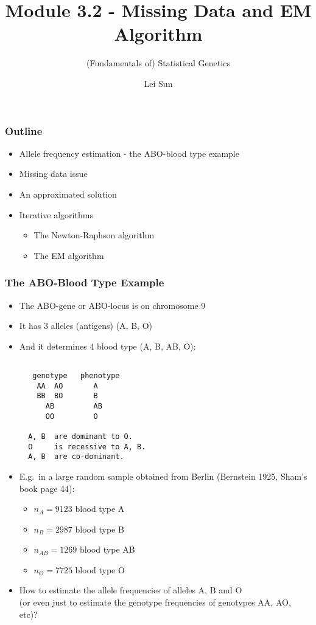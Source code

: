 \documentclass[10pt]{beamer}
\subtitle[Fundamentals of Statistical Genetics] {(Fundamentals of) Statistical Genetics}
\title{Module 3.2 - Missing Data and EM Algorithm}
\author{Lei Sun}
\date{}
\institute[University of Toronto]
{Department of Statistical Sciences, FAS \\Division of Biostatistics, DLSPH\\ University of Toronto}
\begin{document}
\frame{ \titlepage}
\begin{frame}
\frametitle{Outline}

\begin{itemize}
\item Allele frequency estimation - the ABO-blood type example 
\item Missing data issue 
\item An approximated solution 
\item Iterative algorithms 
\begin{itemize}
\item The Newton-Raphson algorithm
\item The EM algorithm 
\end{itemize}
\end{itemize}
\end{frame}
\begin{frame}
\frametitle{The ABO-Blood Type Example} 
\begin{itemize}

\item The ABO-gene or ABO-locus is on chromosome 9
\item It has 3 alleles (antigens) (A, B, O) 
\item And it determines  4 blood type (A, B, AB, O):

{\small
\begin{verbatim}
  
   genotype   phenotype
    AA  AO       A
    BB  BO       B
      AB         AB
      OO         O  

  A, B  are dominant to O.
  O     is recessive to A, B.
  A, B  are co-dominant.

\end{verbatim}
}
\pagebreak

\item E.g.\ in a large random sample obtained from Berlin (Bernstein 1925, Sham's book page 44):
\begin{itemize}
\item $n_A=9123$ blood type A 
\item $n_B=2987$ blood type B 
\item $n_{AB}=1269$ blood type AB
\item $n_O=7725$ blood type O
\end{itemize}
\bigskip

\item How to estimate the allele frequencies of alleles A, B and O \\
(or even just to estimate the genotype frequencies of genotypes AA, AO, etc)? 
\end{itemize}
\end{frame}
\end{document}
